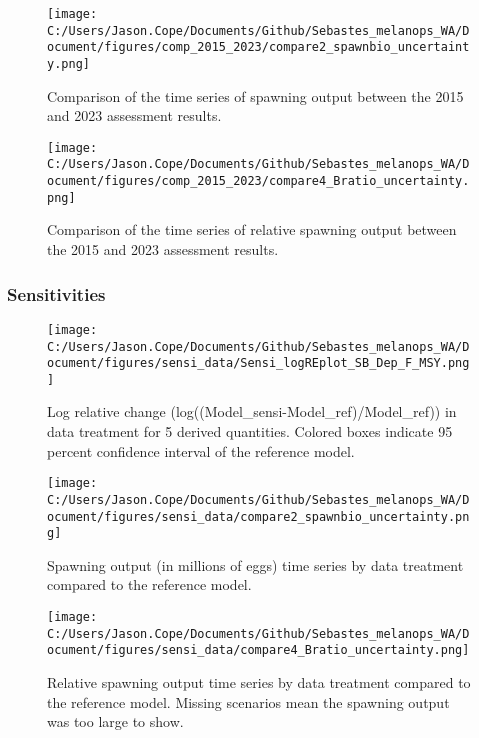 \documentclass[11pt,
  english,
  letterpaper,
]{article}
\begin{document}
\pagebreak

\begin{figure}
\centering
\texttt{[image: C:/Users/Jason.Cope/Documents/Github/Sebastes\_melanops\_WA/Document/figures/comp\_2015\_2023/compare2\_spawnbio\_uncertainty.png]}
\caption{Comparison of the time series of spawning output between the 2015 and 2023 assessment results.\label{fig:comp_ssb}}
\end{figure}

\pagebreak

\begin{figure}
\centering
\texttt{[image: C:/Users/Jason.Cope/Documents/Github/Sebastes\_melanops\_WA/Document/figures/comp\_2015\_2023/compare4\_Bratio\_uncertainty.png]}
\caption{Comparison of the time series of relative spawning output between the 2015 and 2023 assessment results.\label{fig:comp_depl}}
\end{figure}

\pagebreak

\hypertarget{sensitivities}{%
\subsubsection{Sensitivities}\label{sensitivities}}

\begin{figure}
\centering
\texttt{[image: C:/Users/Jason.Cope/Documents/Github/Sebastes\_melanops\_WA/Document/figures/sensi\_data/Sensi\_logREplot\_SB\_Dep\_F\_MSY.png]}
\caption{Log relative change (log((Model\_sensi-Model\_ref)/Model\_ref)) in data treatment for 5 derived quantities. Colored boxes indicate 95 percent confidence interval of the reference model.\label{fig:sensi-data-RE}}
\end{figure}

\pagebreak

\begin{figure}
\centering
\texttt{[image: C:/Users/Jason.Cope/Documents/Github/Sebastes\_melanops\_WA/Document/figures/sensi\_data/compare2\_spawnbio\_uncertainty.png]}
\caption{Spawning output (in millions of eggs) time series by data treatment compared to the reference model.\label{fig:sensi-data-ssb}}
\end{figure}

\pagebreak

\begin{figure}
\centering
\texttt{[image: C:/Users/Jason.Cope/Documents/Github/Sebastes\_melanops\_WA/Document/figures/sensi\_data/compare4\_Bratio\_uncertainty.png]}
\caption{Relative spawning output time series by data treatment compared to the reference model. Missing scenarios mean the spawning output was too large to show.\label{fig:sensi-data-depl}}
\end{figure}
\end{document}

